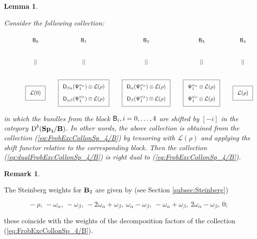 \documentclass[sn-mathphys-num]{sn-jnl}%
\newcommand{\Ll}{\mathcal L}
\newcommand*{\Dd}{\mathop{\mathrm D\kern0pt}\nolimits}
\newcommand{\B}{{\sf B}}
\newcommand{\fb}{\mathbf B}
\newtheorem{lemma}[theorem]{Lemma}
\theoremstyle{definition}
\newtheorem{remark}[theorem]{Remark}
\begin{document}
\begin{lemma}\label{lem:dualB_2-Demazure-FEC}

Consider the following collection:
\begin{figure}[H]

\begin{equation}\label{eq:dualFrobExcCollonSp_4/B}
\scalebox{.8}{
\xymatrix{
\B _0 & \B _1& \B _2& \B _3& \B _4\\
|| & || & || & || & || \\
*++<10pt>[F]\txt{$\Ll (0)$}
&*++<10pt>[F]\txt{${\sf D}_{\beta\alpha}(\Psi _1^{\omega _{\alpha}})\otimes \Ll (\rho)$  \\ \\ ${\sf D}_{\alpha\beta}(\Psi _1^{\omega _{\beta}})\otimes \Ll (\rho)$}
&*++<10pt>[F]\txt{${\sf D}_{\alpha}(\Psi _1^{\omega _{\alpha}})\otimes \Ll (\rho)$  \\ \\ ${\sf D}_{\beta}(\Psi _1^{\omega _{\beta}})\otimes \Ll (\rho)$}
&*++<10pt>[F]\txt{$\Psi _1^{\omega _{\alpha}}\otimes \Ll (\rho)$  \\ \\ $\Psi _1^{\omega _{\beta}}\otimes \Ll (\rho)  $}
 &*++<10pt>[F]\txt{$\Ll (\rho)$}
}}
\end{equation}

 \end{figure}
 \noindent
in which the bundles from the block ${\B _i}, i=0,\dots,4$ are shifted by $[-i]$ in the category $\Dd ^b({\bf Sp}_4/{\fb})$. In other words, the above collection is obtained from the collection (\ref{eq:FrobExcCollonSp_4/B}) by tensoring with $\Ll (\rho)$ and applying the shift functor relative to the corresponding block. Then the collection (\ref{eq:dualFrobExcCollonSp_4/B}) is right dual to (\ref{eq:FrobExcCollonSp_4/B}). 
 
\end{lemma}

\begin{remark}\label{rem:SteinbergB_2}
{The Steinberg weights for ${\bf B}_2$ are given by (see Section \ref{subsec:Steinberg})

$$\ -\rho, \ -\omega _{\alpha}, \ -\omega _{\beta}, \ -2\omega _{\alpha}+\omega _{\beta}, \ \omega _{\alpha}-\omega _{\beta}, \ -\omega _{\alpha}+\omega _{\beta}, \ 2\omega _{\alpha}-\omega _{\beta}, \ 0;$$

these coincide with the weights of the decomposition factors of the collection (\ref{eq:FrobExcCollonSp_4/B}).
}
\end{remark}
\end{document}
